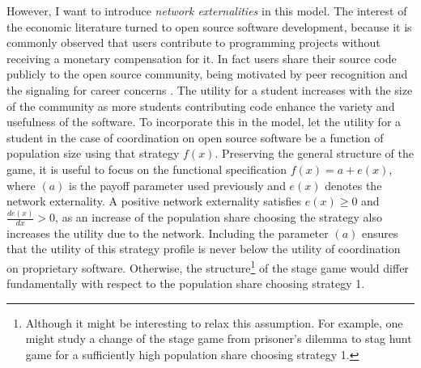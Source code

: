 However, I want to introduce \textit{network externalities} in this model. 
The interest of the economic literature turned to open source software 
development, because it is commonly observed that users contribute to 
programming projects without receiving a monetary compensation for it.
In fact users share their source code publicly to the open source community,
being motivated by peer recognition and the signaling for career concerns
\parencite[21]{lerner_simple_2002}.
The utility for a student increases with the size of the community as 
more students contributing code enhance the variety and usefulness of the 
software. 
To incorporate this in the model, let the utility for a student 
in the case of coordination on open source software be a function of 
population size using that strategy $f(x)$. 
Preserving the general structure of the
game, it is useful to focus on the functional specification 
$f(x) = a + e(x)$, where $(a)$ is the payoff parameter used 
previously and $e(x)$ denotes the network externality. 
A positive network externality satisfies $e(x)\geq 0$ and 
$\frac{de(x)}{dx}>0$, 
as an increase of the population share choosing the strategy
also increases the utility due to the network. 
Including the parameter $(a)$ ensures that the utility of this 
strategy profile is never below the utility of coordination on 
proprietary software. Otherwise, the structure\footnote{Although it might be interesting
to relax this assumption. For example, one might study a change of the stage game from 
prisoner's dilemma to stag hunt game for a sufficiently high population share
choosing strategy 1.} of the stage game would 
differ fundamentally with respect to the population share choosing strategy 1. 

